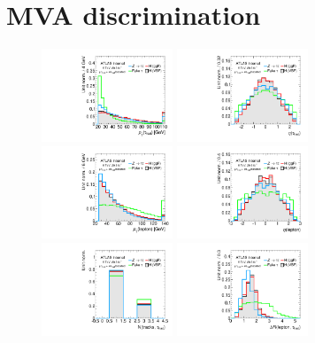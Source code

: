 \section{MVA discrimination}
\label{sec:strategy-mva}

\begin{figure}[tp]
  \centering
  \includegraphics[width=0.35\textwidth]{figures/overlaid/boost/tau-pt}
  \includegraphics[width=0.35\textwidth]{figures/overlaid/boost/tau-eta}
  \includegraphics[width=0.35\textwidth]{figures/overlaid/boost/lep-pt-hi}
  \includegraphics[width=0.35\textwidth]{figures/overlaid/boost/lep-eta}
  \includegraphics[width=0.35\textwidth]{figures/overlaid/boost/tau-numTrack}
  \includegraphics[width=0.35\textwidth]{figures/overlaid/boost/taulep-dR}

\end{figure}
